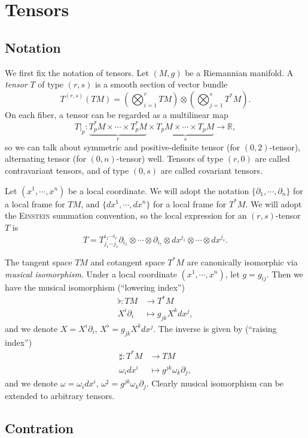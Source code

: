 \section{Tensors}

\subsection{Notation}

We first fix the notation of tensors.
Let $(M,g)$ be a Riemannian manifold.
A \emph{tensor} $T$ of type $(r,s)$ is a smooth section of vector bundle
\[T^{(r,s)}(TM)=\left(\bigotimes_{i=1}^rTM\right)\otimes\left(\bigotimes_{j=1}^sT^*M\right).\]
On each fiber, a tensor can be regarded as a multilinear map
\[T|_{p}:\underbrace{T^*_pM\times\cdots\times T^*_pM}_{r}\times\underbrace{T_pM\times\cdots\times T_pM}_{s}\to\mathbb{R},\]
so we can talk about symmetric and positive-definite tensor (for $(0,2)$-tensor), alternating tensor (for $(0,n)$-tensor) well.
Tensors of type $(r,0)$ are called contravariant tensors, and of type $(0,s)$ are called covariant tensors.

Let $(x^1,\cdots,x^n)$ be a local coordinate.
We will adopt the notation $\{\partial_1,\cdots,\partial_n\}$ for a local frame for $TM$, and $\{dx^1,\cdots,dx^n\}$ for a local frame for $T^*M$.
We will adopt the \textsc{Einstein} summation convention, so the local expression for an $(r,s)$-tensor $T$ is
\[T=T^{i_1\cdots i_r}_{j_1\cdots j_s}\partial_{i_1}\otimes\cdots\otimes\partial_{i_r}\otimes dx^{j_1}\otimes\cdots\otimes dx^{j_s}.\]

The tangent space $TM$ and cotangent space $T^*M$ are canonically isomorphic via \emph{musical isomorphism}.
Under a local coordinate $(x^1,\cdots,x^n)$, let $g=g_{ij}$.
Then we have the musical isomorphism (``lowering index'')
\begin{align*}
    \flat:TM&\to T^*M\\
    X^i\partial_i&\mapsto g_{jk}X^kdx^j,
\end{align*}
and we denote $X=X^i\partial_i$, $X^\flat=g_{jk}X^kdx^j$.
The inverse is given by (``raising index'')
\begin{align*}
    \sharp:T^*M&\to TM\\
    \omega_idx^i&\mapsto g^{jk}\omega_k\partial_j,
\end{align*}
and we denote $\omega=\omega_idx^i$, $\omega^\sharp=g^{jk}\omega_k\partial_j$.
Clearly musical isomorphism can be extended to arbitrary tensors.

\subsection{Contration}


